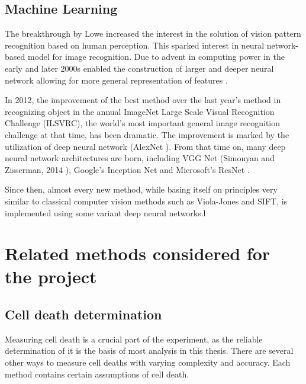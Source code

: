 \documentclass[pdftex,12pt,a4paper]{report}
\begin{document}
\subsection{Machine Learning}
\label{subsection:ml_advances}

The breakthrough by Lowe increased the interest in the solution of vision pattern recognition based on human perception. This sparked interest in neural network-based model for image recognition. Due to advent in computing power in the early and later 2000s enabled the construction of larger and deeper neural network allowing for more general representation of features \cite{goodfellow2016deep}.

In 2012, the improvement of the best method over the  last year's method in recognizing object in the annual ImageNet Large Scale Visual Recognition Challenge (ILSVRC), the world's most important general image recognition challenge at that time, has been dramatic. The improvement is marked by the utilization of deep neural network (AlexNet \cite{krizhevsky2012imagenet}). From that time on, many deep neural network architectures are born, including VGG Net (Simonyan  and Zisserman, 2014 \cite{simonyan2014very}), Google's Inception Net \cite{szegedy2015going} and Microsoft's ResNet \cite{he2016deep}.

Since then, almost every new method, while basing itself on principles very similar to classical computer vision methods such as Viola-Jones and SIFT, is implemented using some variant deep neural networks.l

\section{Related methods considered for the project}

\subsection{Cell death determination}
\label{subsection:comp_cell_death_determination}

Measuring cell death is a crucial part of the experiment, as the reliable determination of it is the basis of most analysis in this thesis. There are several other ways to measure cell deaths with varying complexity and accuracy. Each method contains certain assumptions of cell death.
\end{document}
